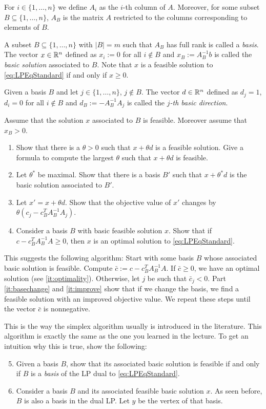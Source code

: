 \begin{enumerate}
For $i\in \{1, \ldots, n\}$ we define $A_i$ as the $i$-th column of $A$. Moreover, for some subset $B\subseteq \{1, \ldots, n\}$, $A_B$ is the matrix $A$ restricted to the columns corresponding to elements of $B$.

A subset $B\subseteq \{1, \ldots, n\}$ with $|B|=m$ such that $A_B$ has full rank is called a \emph{basis}.
The vector $x\in \mathbb{R}^n$ defined as $x_i := 0$ for all $i\notin B$ and $x_B:=A_B^{-1}b$ is called the \emph{basic solution} associated to $B$.
Note that $x$ is a feasible solution to \eqref{eq:LPEqStandard} if and only if $x\geq 0$.



Given a basis $B$ and let $j\in \{1, \ldots, n\}$, $j\notin B$. The vector $d\in \mathbb{R}^n$ defined as $d_j = 1$, $d_i=0$ for all $i\notin B$ and
$d_B := - A_B^{-1} A_j$ is called the \emph{$j$-th basic direction}.

Assume that the solution $x$ associated to $B$ is feasible. Moreover assume that $x_B>0$.



   
\begin{enumerate}
 \item Show that there is a $\theta >0$ such that $x+ \theta d$ is a feasible solution. Give a formula to compute the largest $\theta$ such that $x+ \theta d$ is feasible.
 \item \label{it:basechange} Let $\theta^*$ be maximal. Show that there is a basis $B'$ such that $x+ \theta^* d$ is the basic solution associated to $B'$.
 \item \label{it:improve} Let $x'=x+\theta d$. Show that the objective value of $x'$ changes by $\theta \left(c_j - c_B^TA_B^{-1} A_j\right)$.
 \item \label{it:optimality} Consider a basis $B$ with basic feasible solution $x$. Show that if $c - c_B^T A_B^{-1} A \geq 0 $, then $x$ is an optimal solution to \eqref{eq:LPEqStandard}.
\end{enumerate}
This suggests the following algorithm: Start with some basis $B$ whose associated basic solution is feasible. Compute $\bar c := c - c_B^T A_B^{-1} A$. If $\bar c \geq 0$, we have an optimal solution (see \ref{it:optimality}). Otherwise, let $j$ be such that $\bar c_j < 0$. Part \ref{it:basechange} and \ref{it:improve} show that if we change the basis, 
we find a feasible solution with an improved objective value. We repeat these steps until the vector $\bar c$ is nonnegative.

This is the way the simplex algorithm usually is introduced in the literature. This algorithm is exactly the same as the one you learned in the lecture.
To get an intuition why this is true, show the following:
\begin{enumerate}
\setcounter{enumi}{4}
\item Given a basis $B$, show that its associated basic solution is feasible if and only if $B$ is a \emph{basis} of the LP dual to \eqref{eq:LPEqStandard}.
 \item Consider a basis $B$ and its associated feasible basic solution $x$. As seen before, $B$ is also a basis in the dual LP. 
  Let $y$ be the vertex of that basis. 


\end{enumerate}
\end{enumerate}
